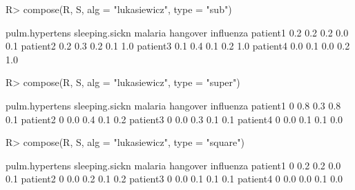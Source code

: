 \begin{Schunk}
% --begin: "comp.subsupsquare"
\begin{Sinput}
R> compose(R, S, alg = "lukasiewicz", type = "sub")
\end{Sinput}
\begin{Soutput}
         pulm.hypertens sleeping.sickn malaria hangover influenza
patient1            0.2            0.2     0.2      0.0       0.1
patient2            0.2            0.3     0.2      0.1       1.0
patient3            0.1            0.4     0.1      0.2       1.0
patient4            0.0            0.1     0.0      0.2       1.0
\end{Soutput}
\begin{Sinput}
R> compose(R, S, alg = "lukasiewicz", type = "super")
\end{Sinput}
\begin{Soutput}
         pulm.hypertens sleeping.sickn malaria hangover influenza
patient1              0            0.8     0.3      0.8       0.1
patient2              0            0.0     0.4      0.1       0.2
patient3              0            0.0     0.3      0.1       0.1
patient4              0            0.0     0.1      0.1       0.0
\end{Soutput}
\begin{Sinput}
R> compose(R, S, alg = "lukasiewicz", type = "square")
\end{Sinput}
\begin{Soutput}
         pulm.hypertens sleeping.sickn malaria hangover influenza
patient1              0            0.2     0.2      0.0       0.1
patient2              0            0.0     0.2      0.1       0.2
patient3              0            0.0     0.1      0.1       0.1
patient4              0            0.0     0.0      0.1       0.0
\end{Soutput}
%
% --end: "comp.subsupsquare"
\end{Schunk}
